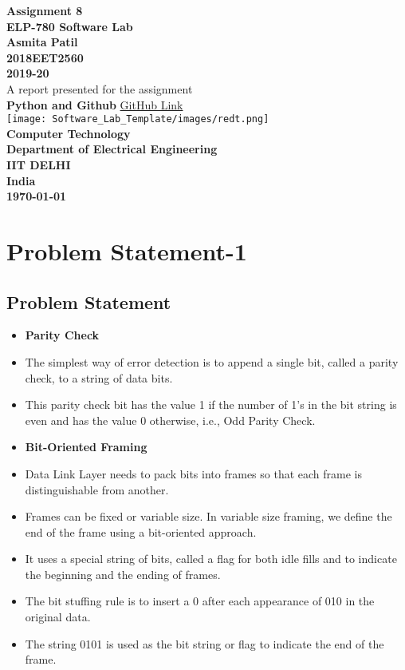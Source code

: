 \documentclass[11pt,oneside]{book}
\begin{document}
\frontmatter

\begin{titlepage}
\begin{center}
{\LARGE \textbf{Assignment 8}}\\[1cm]\LARGE {\textbf{ELP-780 Software Lab}}\\[0.3cm]
{\Large \textbf{Asmita Patil}}\\[0.25cm]
{\Large \textbf{2018EET2560}}\\[0.25cm]
{\Large \textbf{2019-20}}\\[1cm]
{\Large A report presented for the assignment}\\[1cm]
{\Large \textbf{Python and Github }
\hyperlink{https://github.com/eet182560/Assignment_8/}{GitHub Link}}\\[2cm]
\linespread{1}
\texttt{[image: Software\_Lab\_Template/images/redt.png]}\\[2cm]
{\large \textbf{Computer Technology}}\\[0.25cm] %
\large \textbf{Department of Electrical Engineering}\\[0.25cm] 
\large \textbf{IIT DELHI}\\[0.25cm]
\large \textbf{India}\\[0.3cm]
\textbf{\today}
\end{center}

\end{titlepage}
\tableofcontents
\mainmatter

\chapter{\textbf{Problem Statement-1}}
\section{Problem Statement}
\begin{itemize}
    \item \textbf{Parity Check}
    \item The simplest way of error detection is to append a single bit, called a parity check, to a string of data bits. 
    \item This parity check bit has the value 1 if the number of 1’s in the bit string is even and has the value 0 otherwise, i.e., Odd Parity Check.
    \item \textbf{Bit-Oriented Framing}
    \item Data Link Layer needs to pack bits into frames so that each frame is distinguishable from another. 
    \item Frames can be fixed or variable size. In variable size framing, we define the end of the frame using a bit-oriented approach. 
    \item It uses a special string of bits, called a flag for both idle fills and to indicate the beginning and the ending of frames.
    \item The bit stuffing rule is to insert a 0 after each appearance of 010 in the original data. 
    \item The string 0101 is used as the bit string or flag to indicate the end of the frame.

\end{itemize}
\end{document}
